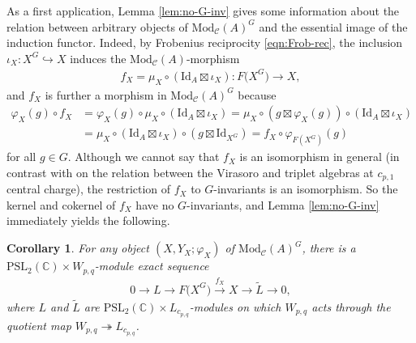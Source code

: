 \documentclass[pdftex]{sigma}
\numberwithin{equation}{section}
\newtheorem{Corollary}[Theorem]{Corollary}
\theoremstyle{definition}
\begin{document}
As a first application, Lemma \ref{lem:no-G-inv} gives some information about the relation between arbitrary objects of $\mathrm{Mod}_\mathcal{C}(A)^G$ and the essential image of the induction functor.
Indeed, by Frobenius reciprocity \eqref{eqn:Frob-rec}, the inclusion $\iota_X\colon X^G\hookrightarrow X$ induces the $\mathrm{Mod}_\mathcal{C}(A)$-morphism
\begin{gather*}
f_X = \mu_X\circ(\mathrm{Id}_A\boxtimes \iota_X)\colon F\bigl(X^G\bigr)\longrightarrow X,
\end{gather*}
and $f_X$ is further a morphism in $\mathrm{Mod}_\mathcal{C}(A)^G$ because
\begin{align*}
\varphi_X(g)\circ f_X & =\varphi_X(g)\circ\mu_X\circ(\mathrm{Id}_A\boxtimes\iota_X) =\mu_X\circ(g\boxtimes\varphi_X(g))\circ(\mathrm{Id}_A\boxtimes\iota_X)\\
& =\mu_X\circ(\mathrm{Id}_A\boxtimes\iota_X)\circ(g\boxtimes\mathrm{Id}_{X^G})=f_X\circ\varphi_{F(X^G)}(g)
\end{align*}
for all $g\in G$. Although we cannot say that $f_X$ is an isomorphism in general (in contrast with \cite[Theorem 7.14]{MY-cp1-Vir} on the relation between the Virasoro and triplet algebras at $c_{p,1}$ central charge), the restriction of $f_X$ to $G$-invariants is an isomorphism. So the kernel and cokernel of $f_X$ have no $G$-invariants, and Lemma \ref{lem:no-G-inv} immediately yields the following.

\begin{Corollary}
For any object $(X,Y_X;\varphi_X)$ of $\mathrm{Mod}_\mathcal{C}(A)^G$, there is a $\mathrm{PSL}_2(\mathbb{C})\times W_{p,q}$-module exact sequence
\begin{gather*}
0\longrightarrow L\longrightarrow F\bigl(X^G\bigr)\xrightarrow{ f_X } X\longrightarrow\widetilde{L}\longrightarrow 0,
\end{gather*}
where $L$ and $\widetilde{L}$ are $\mathrm{PSL}_2(\mathbb{C})\times L_{c_{p,q}}$-modules on which $W_{p,q}$ acts through the quotient map $W_{p,q}\twoheadrightarrow L_{c_{p,q}}$.
\end{Corollary}
\end{document}
